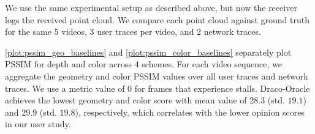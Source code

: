 




%
%
We use the same experimental setup as described above, but now the receiver logs the received point cloud.
%
We compare each point cloud against ground truth for the same 5 videos, 3 user traces per video, and 2 network traces.

%
\cref{plot:pssim_geo_baselines} and \cref{plot:pssim_color_baselines} separately plot PSSIM for depth and color across 4 schemes.
%
For each video sequence, we aggregate the geometry and color PSSIM values over all user traces and network traces.
%
We use a metric value of 0 for frames that experience stalls.
%
Draco-Oracle achieves the lowest geometry and color score with mean value of $28.3$ (std. $19.1$) and $29.9$ (std. $19.8$), respectively, which correlates with the lower opinion scores in our user study.
%

